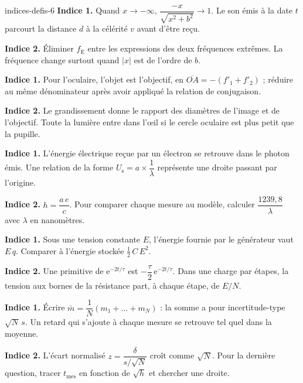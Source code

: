 \begin{blocEdition}{indices-defis-6}
\textbf{Indice 1.} Quand $x\to-\infty$, $\dfrac{-x}{\sqrt{x^2+b^2}}\to1$. Le son émis à la date $t$ parcourt la distance $d$ à la célérité
$v$ avant d'être reçu.\par\smallskip
\textbf{Indice 2.} Éliminer $f_\mathrm{E}$ entre les expressions des deux fréquences extrêmes. La fréquence change surtout quand
$|x|$ est de l'ordre de $b$.\par\smallskip
{}
\textbf{Indice 1.} Pour l'oculaire, l'objet est l'objectif, en $\overline{OA}=-(f'_1+f'_2)$ ; réduire au même dénominateur après avoir
appliqué la relation de conjugaison.\par\smallskip
\textbf{Indice 2.} Le grandissement donne le rapport des diamètres de l'image et de l'objectif. Toute la lumière entre dans
l'œil si le cercle oculaire est plus petit que la pupille.\par\smallskip
{}
\textbf{Indice 1.} L'énergie électrique reçue par un électron se retrouve dans le photon émis. Une relation de la forme
$U_\mathrm{s}=a\times\dfrac{1}{\lambda}$ représente une droite passant par l'origine.\par\smallskip
\textbf{Indice 2.} $h=\dfrac{a\,e}{c}$. Pour comparer chaque mesure au modèle, calculer $\dfrac{1239{,}8}{\lambda}$ avec $\lambda$ en nanomètres.\par\smallskip
{}
\textbf{Indice 1.} Sous une tension constante $E$, l'énergie fournie par le générateur vaut $E\,q$. Comparer à l'énergie stockée
$\frac12\,C\,E^2$.\par\smallskip
\textbf{Indice 2.} Une primitive de $\mathrm{e}^{-2t/\tau}$ est $-\dfrac{\tau}{2}\,\mathrm{e}^{-2t/\tau}$. Dans une charge par étapes, la tension aux bornes
de la résistance part, à chaque étape, de $E/N$.\par\smallskip
{}
\textbf{Indice 1.} Écrire $\bar m=\dfrac{1}{N}\left(m_1+\dots+m_N\right)$ : la somme a pour incertitude-type $\sqrt N\,s$. Un retard qui
s'ajoute à chaque mesure se retrouve tel quel dans la moyenne.\par\smallskip
\textbf{Indice 2.} L'écart normalisé $z=\dfrac{\delta}{s/\sqrt N}$ croît comme $\sqrt N$. Pour la dernière question, tracer $t_\mathrm{mes}$ en
fonction de $\sqrt h$ et chercher une droite.\par\smallskip
\end{blocEdition}
